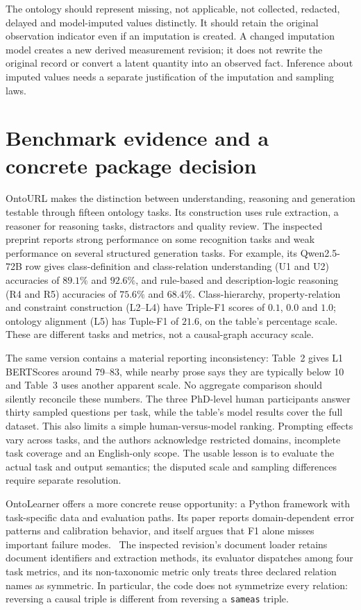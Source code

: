 The ontology should represent missing, not applicable, not collected,
redacted, delayed and model-imputed values distinctly. It should retain the
original observation indicator even if an imputation is created. A changed
imputation model creates a new derived measurement revision; it does not
rewrite the original record or convert a latent quantity into an observed
fact. Inference about imputed values needs a separate justification of the
imputation and sampling laws.

\section{Benchmark evidence and a concrete package decision}

OntoURL makes the distinction between understanding, reasoning and generation
testable through fifteen ontology tasks. Its construction uses rule
extraction, a reasoner for reasoning tasks, distractors and quality review.
The inspected preprint reports strong performance on some recognition tasks
and weak performance on several structured generation tasks. For example,
its Qwen2.5-72B row gives class-definition and class-relation understanding
(U1 and U2) accuracies of \(89.1\%\) and \(92.6\%\), and rule-based and
description-logic reasoning (R4 and R5) accuracies of \(75.6\%\) and \(68.4\%\).
Class-hierarchy, property-relation and constraint construction (L2--L4) have
Triple-F1 scores of \(0.1\), \(0.0\) and \(1.0\); ontology alignment (L5)
has Tuple-F1 of \(21.6\), on the table's percentage scale.
These are different tasks and metrics, not a causal-graph accuracy
scale.~\citep{exec17_ontology_ontourl}

The same version contains a material reporting inconsistency: Table~2 gives
L1 BERTScores around 79--83, while nearby prose says they are typically below
10 and Table~3 uses another apparent scale. No aggregate comparison should
silently reconcile these numbers. The three PhD-level human participants
answer thirty sampled questions per task, while the table's model results
cover the full dataset. This also limits a simple human-versus-model
ranking. Prompting effects vary across tasks, and the authors acknowledge
restricted domains, incomplete task coverage and an English-only scope.
The usable lesson is to evaluate the actual task and output semantics;
the disputed scale and sampling differences require separate resolution.

OntoLearner offers a more concrete reuse opportunity: a Python framework
with task-specific data and evaluation paths. Its paper reports
domain-dependent error patterns and calibration behavior, and itself argues
that F1 alone misses important failure modes.~\citep{v12_la_2607_01977}
The inspected revision's document loader retains document identifiers and
extraction methods, its evaluator dispatches among four task metrics, and
its non-taxonomic metric only treats three declared relation names as
symmetric. In particular, the code does not symmetrize every relation:
reversing a causal triple is different from reversing a
\texttt{sameas} triple.~\citep{exec17_ontology_sources}

